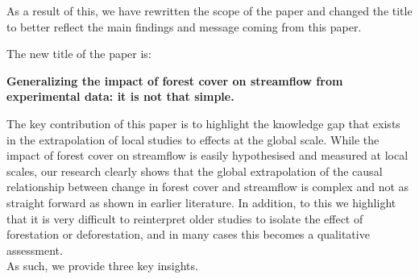 \documentclass[]{elsarticle} %
\begin{document}
As a result of this, we have rewritten the scope of the paper and changed the title to better reflect the main findings and message coming from this paper.

The new title of the paper is:

\textbf{Generalizing the impact of forest cover on streamflow from experimental data: it is not that simple.}

The key contribution of this paper is to highlight the knowledge gap that exists in the extrapolation of local studies to effects at the global scale. While the impact of forest cover on streamflow is easily hypothesised \citep[e.g.][]{zhou2015, hoekvandijke2022} and measured at local scales, our research clearly shows that the global extrapolation of the causal relationship between change in forest cover and streamflow is complex and not as straight forward as shown in earlier literature. In addition, to this we highlight that it is very difficult to reinterpret older studies to isolate the effect of forestation or deforestation, and in many cases this becomes a qualitative assessment.\\
As such, we provide three key insights.
\end{document}
